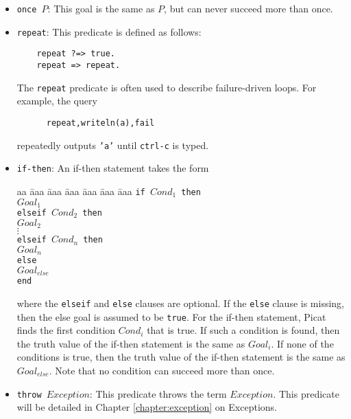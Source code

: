 \begin{itemize}
\item \texttt{once $P$}: This goal is the same as $P$, but can never succeed more than once.
\item \texttt{repeat}: This predicate is defined as follows:
\begin{verbatim}
    repeat ?=> true.
    repeat => repeat.
\end{verbatim}
The \texttt{repeat} predicate is often used to describe failure-driven loops. For example, the query 
\begin{verbatim}
      repeat,writeln(a),fail
\end{verbatim} 
repeatedly outputs \texttt{'a'} until \texttt{ctrl-c} is typed.
\item \texttt{if-then}: An if-then statement takes the form 
\begin{tabbing}
aa \= aaa \= aaa \= aaa \= aaa \= aaa \= aaa \kill
\> \texttt{if $Cond_1$ then} \\
\> \> $Goal_1$ \\
\> \texttt{elseif $Cond_2$ then} \\
\> \> $Goal_2$ \\
\> \> $\vdots$ \\
\> \texttt{elseif $Cond_{n}$ then} \\
\> \> $Goal_{n}$ \\
\> \texttt{else} \\
\> \> $Goal_{else}$ \\
\> \texttt{end}
\end{tabbing}
where the \texttt{elseif} and \texttt{else} clauses are optional. If the \texttt{else} clause is missing, then the else goal is assumed to be \texttt{true}. For the if-then statement, Picat finds the first condition $Cond_i$ that is true. If such a condition is found, then the truth value of the if-then statement is the same as $Goal_i$. If none of the conditions is true, then the truth value of the if-then statement is the same as $Goal_{else}$. Note that no condition can succeed more than once. 
\item \texttt{throw $Exception$}: This predicate throws the term $Exception$. This predicate will be detailed in Chapter \ref{chapter:exception} on Exceptions.


\end{itemize}

